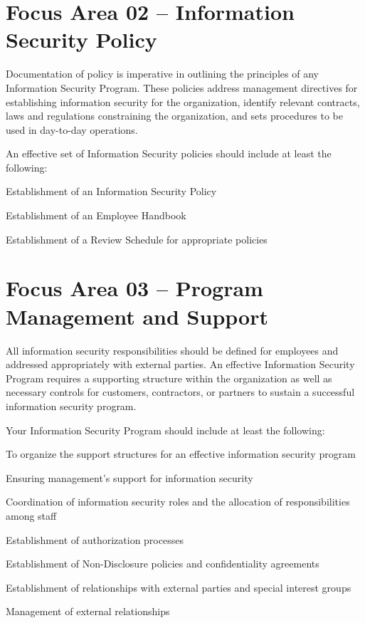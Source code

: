 \documentclass{needs}
\begin{document}
		\vspace{20pt}
		\fOneTable
		
	\section{Focus Area 02 -- Information Security Policy}
	
		Documentation of policy is imperative in outlining the principles of any Information Security Program.  These policies address management directives for establishing information security for the organization, identify relevant contracts, laws and regulations constraining the organization, and sets procedures to be used in day-to-day operations.
		
		An effective set of Information Security policies should include at least the following: 
		\begin{checklist}
			\item Establishment of an Information Security Policy
			\item Establishment of an Employee Handbook
			\item Establishment of a Review Schedule for appropriate policies
		\end{checklist}
		
		\vspace{20pt}
		\fTwoTable
				
	\section{Focus Area 03 -- Program Management and Support}
	
		All information security responsibilities should be defined for employees and addressed appropriately with external parties.  An effective Information Security Program requires a supporting structure within the organization as well as necessary controls for customers, contractors, or partners to sustain a successful information security program.
		
		Your Information Security Program should include at least the following: 
		\begin{checklist}
			\item To organize the support structures for an effective information security program
			\item Ensuring management’s support for information security
			\item Coordination of information security roles and the allocation of responsibilities among staff
			\item Establishment of authorization processes
			\item Establishment of Non-Disclosure policies and confidentiality agreements
			\item Establishment of relationships with external parties and special interest groups
			\item Management of external relationships
		\end{checklist}		
	
\end{document}
